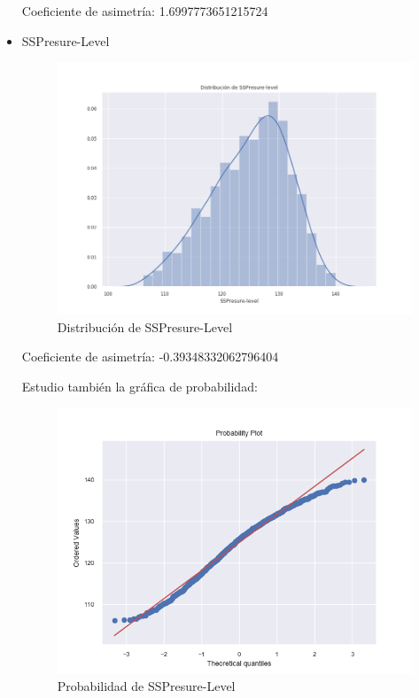 \begin{itemize}
Coeficiente de asimetría: 1.6997773651215724

\item SSPresure-Level

\begin{figure}[H] %
	\centering
	\includegraphics[scale=0.46]{dist-sspr.png}  %
	\caption{Distribución de SSPresure-Level} 
	\label{fig:dist-sspr}
\end{figure}

Coeficiente de asimetría: -0.39348332062796404

Estudio también la gráfica de probabilidad:

\begin{figure}[H] %
	\centering
	\includegraphics[scale=0.46]{prob-ssp.png}  %
	\caption{Probabilidad de SSPresure-Level} 
	\label{fig:prob-sspr}
\end{figure}
\end{itemize}


